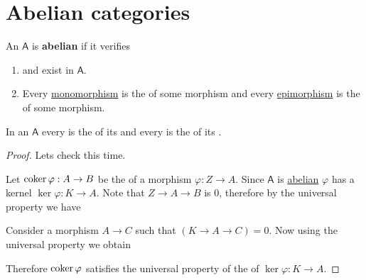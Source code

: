 \documentclass[../../main]{subfiles}
\begin{document}
\section{Abelian categories}
\begin{definition} \label{def:abelian-category}
  An  \(\mathsf{A}\) is \textbf{abelian} if it verifies
  \begin{enumerate}
    \item[A.4)]\label{axiom:abelian-existence}  and  exist in \(\mathsf{A}\).
    \item[A.5)]\label{axiom:abelian-morphisms} Every \hyperref[def:mono-epi-morphism]{monomorphism} is the  of some morphism and every \hyperref[def:mono-epi-morphism]{epimorphism} is the  of some morphism.
  \end{enumerate}
\end{definition}

\begin{lemma} \label{lemma:kernel-of-cokernel-abelian}
  In an  \(\mathsf{A}\) every  is the  of its  and every  is the  of its .
\end{lemma}
\begin{proof}
  Lets check  this time.

  Let \(\operatorname*{coker} \varphi: A \to B\) be the  of a morphism \(\varphi: Z \to A\).
  Since \(\mathsf{A}\) is \hyperref[def:abelian-category]{abelian} \(\varphi\) has a kernel \(\ker \varphi: K \to A\).
  Note that \(Z \to A \to B\) is 0, therefore by the  universal property we have
  \begin{center}
  \end{center}

  Consider a morphism \(A \to C\) such that \((K \to A \to C) = 0\).
  Now using the  universal property we obtain
  \begin{center}
  \end{center}
  Therefore \(\operatorname*{coker} \varphi\) satisfies the universal property of the  of \(\ker \varphi: K \to A\).
\end{proof}
\end{document}
